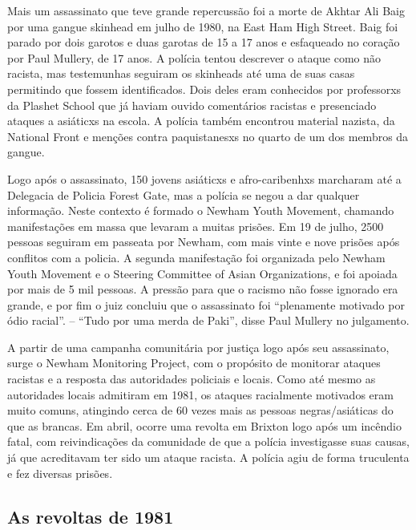 Mais um assassinato que teve grande repercussão foi a morte de Akhtar Ali Baig por uma gangue skinhead em julho de 1980, na East Ham High Street. Baig foi parado por dois garotos e duas garotas de 15 a 17 anos e esfaqueado no coração por Paul Mullery, de 17 anos. A polícia tentou descrever o ataque como não racista, mas testemunhas seguiram os skinheads até uma de suas casas permitindo que fossem identificados. Dois deles eram conhecidos por professorxs da Plashet School que já haviam ouvido comentários racistas e presenciado ataques a asiáticxs na escola. A polícia também encontrou material nazista, da National Front e menções contra paquistanesxs no quarto de um dos membros da gangue.

Logo após o assassinato, 150 jovens asiáticxs e afro-caribenhxs marcharam até a Delegacia de Policia Forest Gate, mas a polícia se negou a dar qualquer informação. Neste contexto é formado o Newham Youth Movement, chamando manifestações em massa que levaram a muitas prisões. Em 19 de julho, 2500 pessoas seguiram em passeata por Newham, com mais vinte e nove prisões após conflitos com a policia. A segunda manifestação foi organizada pelo Newham Youth Movement e o Steering Committee of Asian Organizations, e foi apoiada por mais de 5 mil pessoas. A pressão para que o racismo não fosse ignorado era grande, e por fim o juiz concluiu que o assassinato foi “plenamente motivado por ódio racial”. – “Tudo por uma merda de Paki”, disse Paul Mullery no julgamento.

A partir de uma campanha comunitária por justiça logo após seu assassinato, surge o Newham Monitoring Project, com o propósito de monitorar ataques racistas e a resposta das autoridades policiais e locais. Como até mesmo as autoridades locais admitiram em 1981, os ataques racialmente motivados eram muito comuns, atingindo cerca de 60 vezes mais as pessoas negras/asiáticas do que as brancas. Em abril, ocorre uma revolta em Brixton logo após um incêndio fatal, com reivindicações da comunidade de que a polícia investigasse suas causas, já que acreditavam ter sido um ataque racista. A polícia agiu de forma truculenta e fez diversas prisões.


\subsection{As revoltas de 1981}

